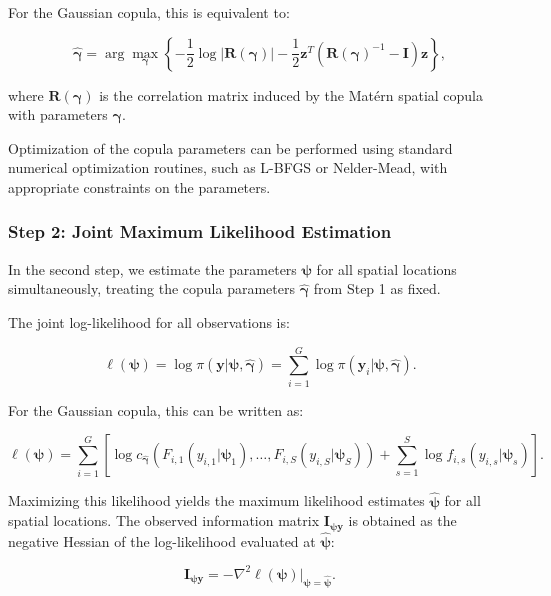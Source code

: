 For the Gaussian copula, this is equivalent to:

\begin{equation}
    \hat{\boldsymbol{\gamma}} = \arg\max_{\boldsymbol{\gamma}} \left\{-\frac{1}{2}\log|\mathbf{R}(\boldsymbol{\gamma})| - \frac{1}{2}\mathbf{z}^T(\mathbf{R}(\boldsymbol{\gamma})^{-1} - \mathbf{I})\mathbf{z}\right\},
\end{equation}

where $\mathbf{R}(\boldsymbol{\gamma})$ is the correlation matrix induced by the Matérn spatial copula with parameters $\boldsymbol{\gamma}$.

Optimization of the copula parameters can be performed using standard numerical optimization routines, such as L-BFGS or Nelder-Mead, with appropriate constraints on the parameters.

\subsubsection{Step 2: Joint Maximum Likelihood Estimation}
In the second step, we estimate the parameters $\boldsymbol{\psi}$ for all spatial locations simultaneously, treating the copula parameters $\hat{\boldsymbol{\gamma}}$ from Step 1 as fixed.

The joint log-likelihood for all observations is:

\begin{equation}
    \ell(\boldsymbol{\psi}) = \log \pi(\mathbf{y}|\boldsymbol{\psi}, \hat{\boldsymbol{\gamma}}) = \sum_{i=1}^G \log \pi(\mathbf{y}_i|\boldsymbol{\psi}, \hat{\boldsymbol{\gamma}}).
\end{equation}

For the Gaussian copula, this can be written as:

\begin{equation}
    \ell(\boldsymbol{\psi}) = \sum_{i=1}^G \left[\log c_{\hat{\boldsymbol{\gamma}}}(F_{i,1}(y_{i,1}|\boldsymbol{\psi}_1), \ldots, F_{i,S}(y_{i,S}|\boldsymbol{\psi}_S)) + \sum_{s=1}^{S} \log f_{i,s}(y_{i,s}|\boldsymbol{\psi}_s)\right].
\end{equation}

Maximizing this likelihood yields the maximum likelihood estimates $\hat{\boldsymbol{\psi}}$ for all spatial locations. The observed information matrix $\mathbf{I}_{\boldsymbol{\psi}\mathbf{y}}$ is obtained as the negative Hessian of the log-likelihood evaluated at $\hat{\boldsymbol{\psi}}$:

\begin{equation}
    \mathbf{I}_{\boldsymbol{\psi}\mathbf{y}} = -\nabla^2 \ell(\boldsymbol{\psi})|_{\boldsymbol{\psi}=\hat{\boldsymbol{\psi}}}.
\end{equation}

